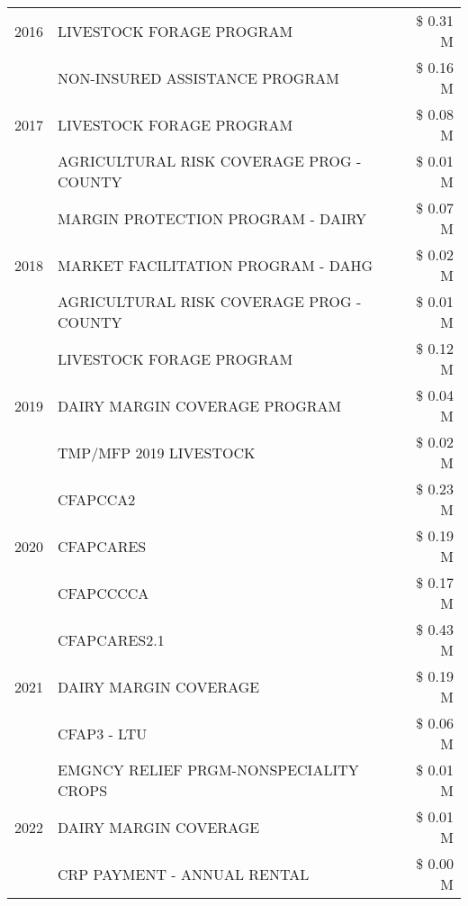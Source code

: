 \begin{tabular}{llr}
\cline{1-3}
2016 & LIVESTOCK FORAGE PROGRAM & \$ 0.31 M \\
\cline{1-3}
\multirow[t]{3}{*}{2017} & NON-INSURED ASSISTANCE PROGRAM & \$ 0.16 M \\
 & LIVESTOCK FORAGE PROGRAM & \$ 0.08 M \\
 & AGRICULTURAL RISK COVERAGE PROG - COUNTY & \$ 0.01 M \\
\cline{1-3}
\multirow[t]{3}{*}{2018} & MARGIN PROTECTION PROGRAM - DAIRY & \$ 0.07 M \\
 & MARKET FACILITATION PROGRAM - DAHG & \$ 0.02 M \\
 & AGRICULTURAL RISK COVERAGE PROG - COUNTY & \$ 0.01 M \\
\cline{1-3}
\multirow[t]{3}{*}{2019} & LIVESTOCK FORAGE PROGRAM & \$ 0.12 M \\
 & DAIRY MARGIN COVERAGE PROGRAM & \$ 0.04 M \\
 & TMP/MFP 2019 LIVESTOCK & \$ 0.02 M \\
\cline{1-3}
\multirow[t]{3}{*}{2020} & CFAPCCA2 & \$ 0.23 M \\
 & CFAPCARES & \$ 0.19 M \\
 & CFAPCCCCA & \$ 0.17 M \\
\cline{1-3}
\multirow[t]{3}{*}{2021} & CFAPCARES2.1 & \$ 0.43 M \\
 & DAIRY MARGIN COVERAGE & \$ 0.19 M \\
 & CFAP3 - LTU & \$ 0.06 M \\
\cline{1-3}
\multirow[t]{3}{*}{2022} & EMGNCY RELIEF PRGM-NONSPECIALITY CROPS & \$ 0.01 M \\
 & DAIRY MARGIN COVERAGE & \$ 0.01 M \\
 & CRP PAYMENT - ANNUAL RENTAL & \$ 0.00 M \\
\cline{1-3}
\bottomrule
\end{tabular}
